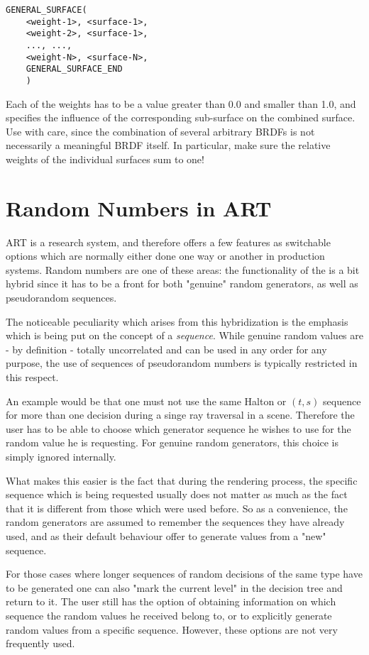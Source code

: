 \begin{description}
\begin{verbatim}
GENERAL_SURFACE(
    <weight-1>, <surface-1>,
    <weight-2>, <surface-1>,
    ..., ...,
    <weight-N>, <surface-N>,
    GENERAL_SURFACE_END
    )
\end{verbatim}

Each of the weights has to be a value greater than 0.0 and smaller than 1.0, and specifies the influence of the corresponding sub-surface on the combined surface. Use with care, since the combination of several arbitrary BRDFs is not necessarily a meaningful BRDF itself. In particular, make sure the relative weights of the individual surfaces sum to one! 

\end{description}

\chapter{Random Numbers in ART}

ART is a research system, and therefore offers a few features as switchable options which are normally either done one way or another in production systems. Random numbers are one of these areas: the functionality of the 
    is a bit hybrid since it has to be a front for both "genuine" random
    generators, as well as pseudorandom sequences.

    The noticeable peculiarity which arises from this hybridization is the
    emphasis which is being put on the concept of a \emph{sequence}. While genuine
    random values are - by definition - totally uncorrelated and can be used
    in any order for any purpose, the use of sequences of pseudorandom
    numbers is typically restricted in this respect.

    An example would be that one must not use the same Halton or
    $(t,s)$ sequence for more than one decision during a singe ray traversal
    in a scene. Therefore the user has to be able to choose which generator sequence he
    wishes to use for the random value he is requesting. For genuine random
    generators, this choice is simply ignored internally.

    What makes this easier is the fact that during the rendering process, the specific sequence which is being
    requested usually does not matter as much as the fact that it is different
    from those which were used before. So as a convenience, the random
    generators are assumed to remember the sequences they have already used,
    and as their default behaviour offer to generate values from a
    "new" sequence.

    For those cases where longer sequences of random decisions of the same
    type have to be generated one can also "mark the current level" in the
    decision tree and return to it. The user still has the option of obtaining information on which sequence
    the random values he received belong to, or to explicitly generate random
    values from a specific sequence. However, these options are not very
    frequently used.

